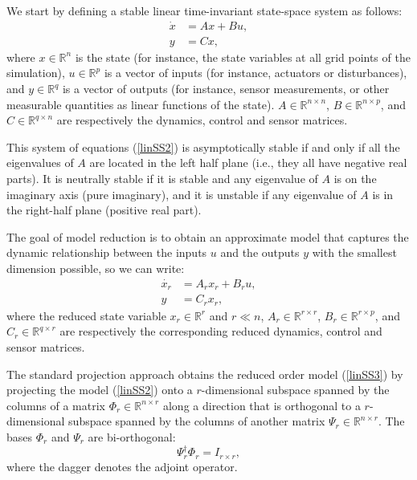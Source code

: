 \documentclass[12pt,lot, lof]{puthesis}
\begin{document}
We start by defining a stable linear time-invariant state-space system as follows: 
\begin{equation}
\label{linSS2}
\begin{aligned}
	\dot{x}&= A x  + B u,   \\
	y &= C x ,
\end{aligned}
\end{equation}
where $x \in \mathbb{R}^n$ is the state (for instance, the state variables at all  grid points of the simulation), $u \in \mathbb{R}^p$ is a vector of inputs (for instance, actuators or disturbances), and $y \in \mathbb{R}^q$ is a vector of outputs (for instance, sensor measurements, or other measurable quantities as linear functions of the state). $A \in \mathbb{R}^{n \times n}$, $B \in \mathbb{R}^{n \times p}$, and $C \in \mathbb{R}^{q \times n}$ are respectively the dynamics, control and sensor matrices.

This system of equations (\ref{linSS2}) is asymptotically stable if and only if all the eigenvalues of $A$ are located in the left half plane (i.e., they all have negative real parts). It is neutrally stable if it is stable and any eigenvalue of $A$ is on the imaginary axis (pure imaginary), and it is unstable if any eigenvalue of $A$ is in the right-half plane (positive real part).

The goal of model reduction is to obtain an approximate model that captures the dynamic relationship between the inputs $u$ and the outputs $y$ with the smallest dimension possible, so we can write:
\begin{equation}
\label{linSS3}
\begin{aligned}
	\dot{x_r}&= A_r x_r  + B_r u,   \\
	y &= C_r x_r ,
\end{aligned}
\end{equation}
where the reduced state variable $x_r \in \mathbb{R}^r$ and $r \ll n$, $A_r \in \mathbb{R}^{r \times r}$, $B_r \in \mathbb{R}^{r \times p}$, and $C_r \in \mathbb{R}^{q \times r}$ are respectively the corresponding reduced dynamics, control and sensor matrices.

The standard projection approach obtains the reduced order model (\ref{linSS3}) by projecting the model (\ref{linSS2}) onto a $r$-dimensional subspace spanned by the columns of a matrix $\Phi_r \in  \mathbb{R}^{n \times r}$ along a direction that is orthogonal to a $r$-dimensional subspace spanned by the columns of another matrix $\Psi_r \in  \mathbb{R}^{n \times r}$. The bases  $\Phi_r$ and  $\Psi_r$ are bi-orthogonal:
\begin{equation}
\label{linSS4}
\Psi_r^{\dagger} \Phi_r = I_{r \times r},
\end{equation}
where the dagger denotes the adjoint operator. 
\end{document}
